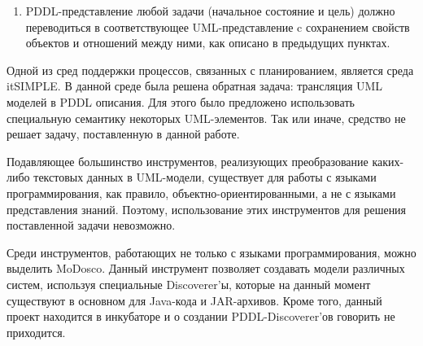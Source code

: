 \documentclass[a4paper,14pt]{extreport}
\begin{document}
\begin{enumerate}
\begin{figure}[H]
\begin{minipage}[h]{0.43\linewidth}
{\begin{verbatim}
            \end{verbatim}
           }      
           
        \end{minipage}    
        \hfill            
        \begin{minipage}[h]{0.43\linewidth}
           {\centering <<effect>> \\}  
           {\raggedright
            \small
        
            \begin{verbatim}
    ! this.at == from and
    ! to.isClear and
    this.at == to and 
    from.isClear
            \end{verbatim}
           }     
           \vfill 
        \end{minipage}

    \caption{Пример преобразования действий}
    \label{img:property-actions}
\end{figure}      

    \item PDDL-представление любой задачи (начальное состояние и цель) должно переводиться в соответствующее UML-представление c сохранением свойств объектов и отношений между ними, как описано в предыдущих пунктах.
    \end{enumerate}
    
    Одной из сред поддержки процессов, связанных с планированием, является среда itSIMPLE\cite{itsimple}. В данной среде была решена обратная задача: трансляция UML моделей в PDDL описания. Для этого было предложено использовать специальную семантику некоторых UML-элементов. Так или иначе, средство не решает задачу, поставленную в данной работе.
    
    Подавляющее большинство инструментов, реализующих преобразование каких-либо текстовых данных в UML-модели, существует для работы с языками программирования, как правило, объектно-ориентированными, а не с языками представления знаний. Поэтому, использование этих инструментов для решения поставленной задачи невозможно. 
    
    Среди инструментов, работающих не только с языками программирования, можно выделить MoDosco. Данный инструмент позволяет создавать модели различных систем, используя специальные Discoverer'ы, которые на данный момент существуют в основном для Java-кода и JAR-архивов. Кроме того, данный проект находится в инкубаторе и о создании PDDL-Discoverer'ов говорить не приходится. 
    
\end{document}
